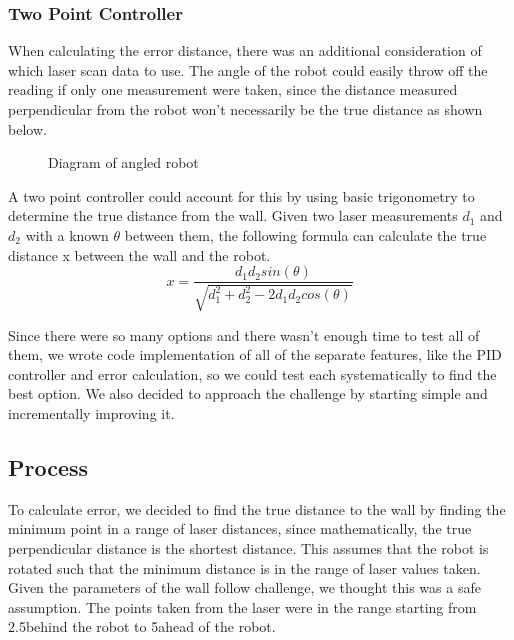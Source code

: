 \documentclass[journal, a4paper]{IEEEtran}
\begin{document}
\subsubsection{Two Point Controller}
When calculating the error distance, there was an additional consideration of which laser scan data to use. The angle of the robot could easily throw off the reading if only one measurement were taken, since the distance measured perpendicular from the robot won't necessarily be the true distance as shown below. \\ 
\begin{figure}[H]
\centering
{}
\caption{Diagram of angled robot}
\end{figure}
A two point controller could account for this by using basic trigonometry to determine the true distance from the wall. Given two laser measurements $d_1$ and $d_2$ with a known $\theta$ between them, the following formula can calculate the true distance x between the wall and the robot.  
\begin{equation}
x = \frac{d_1d_2sin(\theta)}{\sqrt{d_1^2+d_2^2-2d_1d_2cos(\theta)}}
\end{equation}
\par Since there were so many options and there wasn’t enough time to test all of them, we wrote code implementation of all of the separate features, like the PID controller and error calculation, so we could test each systematically to find the best option. We also decided to approach the challenge by starting simple and incrementally improving it.
\subsection{Process}
\par To calculate error, we decided to find the true distance to the wall by finding the minimum point in a range of laser distances, since mathematically, the true perpendicular distance is the shortest distance. This assumes that the robot is rotated such that the minimum distance is in the range of laser values taken. Given the parameters of the wall follow challenge, we thought this was a safe assumption. The points taken from the laser were in the range starting from 2.5\degree behind the robot to 5\degree ahead of the robot.
\end{document}
